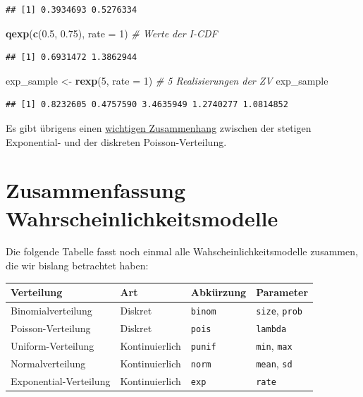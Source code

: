 \documentclass[]{book}
\newenvironment{Shaded}{\begin{snugshade}}{\end{snugshade}}
\newcommand{\KeywordTok}[1]{\textcolor[rgb]{0.13,0.29,0.53}{\textbf{#1}}}
\newcommand{\DataTypeTok}[1]{\textcolor[rgb]{0.13,0.29,0.53}{#1}}
\newcommand{\DecValTok}[1]{\textcolor[rgb]{0.00,0.00,0.81}{#1}}
\newcommand{\FloatTok}[1]{\textcolor[rgb]{0.00,0.00,0.81}{#1}}
\newcommand{\StringTok}[1]{\textcolor[rgb]{0.31,0.60,0.02}{#1}}
\newcommand{\CommentTok}[1]{\textcolor[rgb]{0.56,0.35,0.01}{\textit{#1}}}
\newcommand{\NormalTok}[1]{#1}
\begin{document}
\begin{verbatim}
## [1] 0.3934693 0.5276334
\end{verbatim}

\begin{Shaded}
\begin{Highlighting}[]
\KeywordTok{qexp}\NormalTok{(}\KeywordTok{c}\NormalTok{(}\FloatTok{0.5}\NormalTok{, }\FloatTok{0.75}\NormalTok{), }\DataTypeTok{rate =} \DecValTok{1}\NormalTok{) }\CommentTok{# Werte der I-CDF}
\end{Highlighting}
\end{Shaded}

\begin{verbatim}
## [1] 0.6931472 1.3862944
\end{verbatim}

\begin{Shaded}
\begin{Highlighting}[]
\NormalTok{exp_sample <-}\StringTok{ }\KeywordTok{rexp}\NormalTok{(}\DecValTok{5}\NormalTok{, }\DataTypeTok{rate =} \DecValTok{1}\NormalTok{) }\CommentTok{# 5 Realisierungen der ZV}
\NormalTok{exp_sample}
\end{Highlighting}
\end{Shaded}

\begin{verbatim}
## [1] 0.8232605 0.4757590 3.4635949 1.2740277 1.0814852
\end{verbatim}

Es gibt übrigens einen
\href{https://www.exponentialverteilung.de/vers/beweise/uebergang_poissonverteilung.html}{wichtigen
Zusammenhang} zwischen der stetigen Exponential- und der diskreten
Poisson-Verteilung.

\section{Zusammenfassung
Wahrscheinlichkeitsmodelle}\label{zusammenfassung-wahrscheinlichkeitsmodelle}

Die folgende Tabelle fasst noch einmal alle Wahscheinlichkeitsmodelle
zusammen, die wir bislang betrachtet haben:

\begin{longtable}[]{@{}llll@{}}
\toprule
Verteilung & Art & Abkürzung & Parameter\tabularnewline
\midrule
\endhead
Binomialverteilung & Diskret & \texttt{binom} & \texttt{size},
\texttt{prob}\tabularnewline
Poisson-Verteilung & Diskret & \texttt{pois} &
\texttt{lambda}\tabularnewline
Uniform-Verteilung & Kontinuierlich & \texttt{punif} & \texttt{min},
\texttt{max}\tabularnewline
Normalverteilung & Kontinuierlich & \texttt{norm} & \texttt{mean},
\texttt{sd}\tabularnewline
Exponential-Verteilung & Kontinuierlich & \texttt{exp} &
\texttt{rate}\tabularnewline
\bottomrule
\end{longtable}
\end{document}
